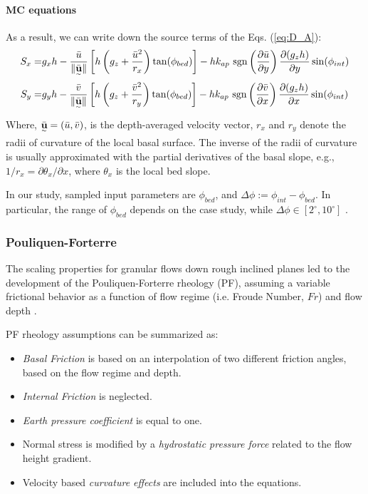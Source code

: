 \documentclass{article}
\begin{document}
\paragraph{MC equations} As a result, we can write down the source terms of the Eqs. (\ref{eq:D_A}):
\begin{eqnarray}\label{S_terms_MC}
S_x =& g_x h  - \frac{\bar{u}}{\| \underset{^\sim}{\bar{\textbf u}} \|} \left[h\left(g_z+\frac{\bar{u}^2}{r_x}\right)\tan(\phi_{bed})\right] - h k_{ap} \ {\rm sgn}\left(\frac{\partial \bar{u}}{\partial y}\right) \frac{\partial (g_z h)}{\partial y} \sin(\phi_{int}) \nonumber \\
 S_y =& g_y h  - \frac{\bar{v}}{\| \underset{^\sim}{\bar{\textbf u}} \|} \left[h\left(g_z +\frac{\bar{v}^2}{r_y}\right)\tan(\phi_{bed})\right] - h k_{ap} \ {\rm sgn}\left({\frac{\partial \bar{v}}{\partial x}}\right) \frac{\partial (g_z h)}{\partial x} \sin(\phi_{int})
\end{eqnarray}
Where, $\underset{^\sim}{\bar{\textbf u}} = (\bar{u} , \bar{v})$, is the depth-averaged velocity vector, $r_x$ and $r_y$ denote the radii of curvature
of the local basal surface. The inverse of the radii of curvature is usually approximated with the partial derivatives of the basal slope, e.g., $1/r_x = \partial \theta_x/\partial x$, where $\theta_x$ is the local bed slope. 

In our study, sampled input parameters are $\phi_{bed}$, and $\Delta \phi:=\phi_{int}-\phi_{bed}$. In particular, the range of $\phi_{bed}$ depends on the case study, while $\Delta \phi \in [2^{\mathrm{\circ}}, 10^{\mathrm{\circ}}]$ \citep{Dalbey2008}.

\subsubsection{Pouliquen-Forterre}\label{PFM}
The scaling properties for granular flows down rough inclined planes led to the development of the Pouliquen-Forterre rheology (PF), assuming a variable frictional behavior as a function of flow regime (i.e. Froude Number, $Fr$) and flow depth \citep{Pouliquen1999, ForterrePouliquen2002, PouliquenForterre2002, ForterrePouliquen2003}.

PF rheology assumptions can be summarized as:
\begin{itemize}
\item \textit{Basal Friction} is based on an interpolation of two different friction angles, based on the flow regime and depth.

\item \textit{Internal Friction} is neglected.

\item \textit{Earth pressure coefficient} is equal to one.

\item Normal stress is modified by a \textit{hydrostatic pressure force} related to the flow height gradient.

\item Velocity based \textit{curvature effects} are included into the equations.
\end{itemize}
\end{document}
